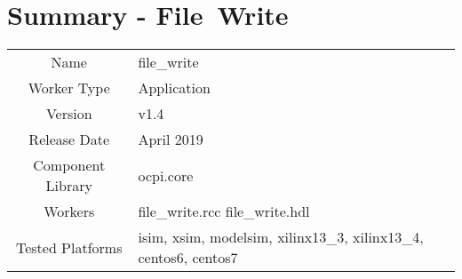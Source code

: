 \documentclass{article}
\author{} %
\date{Version \docVersion} %
\title{\docTitle}
\def\docVersion{1.4}
\def\comp{file\_write}
\def\Comp{File\ Write }
\begin{document}
\section*{Summary - \Comp}
\begin{tabular}{|c|M{13.5cm}|}
	\hline
	                  &                                                                                \\
	\hline
	Name              & \comp                                                                          \\
	\hline
	Worker Type       & Application                                                                    \\
	\hline
	Version           &  v\docVersion \\
	\hline
	Release Date      &  April 2019 \\
	\hline
	Component Library &   ocpi.core\\
	\hline
	Workers           &  file\_write.rcc file\_write.hdl\\
	\hline
	Tested Platforms  &  isim, xsim, modelsim, xilinx13\_3, xilinx13\_4, centos6, centos7\\
	\hline
\end{tabular}
\end{document}
